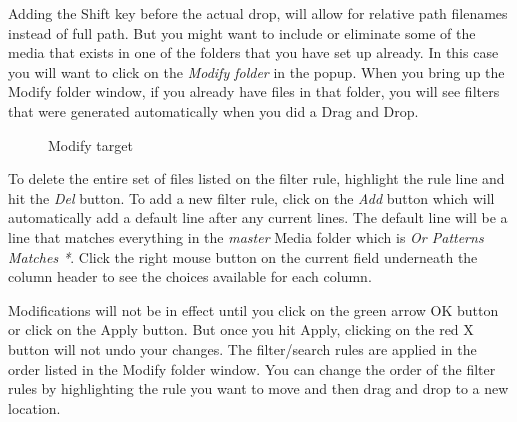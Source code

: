Adding the Shift key before the actual drop, will allow for relative path filenames instead of full path.
But you might want to include or eliminate some of the media that exists in one of the folders that you have set up already.  
In this case you will want to click on the \textit{Modify folder} in the popup.  
When you bring up the Modify folder window, if you already have files in that folder, you will see filters that were generated automatically when you did a Drag and Drop.


\begin{figure}[htpb]
    \centering
    
    \caption{Modify target}
    \label{fig:modify-target}
\end{figure}

To delete the entire set of files listed on the filter rule, highlight the rule line and hit the \textit{Del} button.  
To add a new filter rule, click on the \textit{Add} button which will automatically add a default line after any current lines.  
The default line will be a line that matches everything in the \textit{master} Media folder which is \textit{Or  Patterns  Matches   *}.  
Click the right mouse button on the current field underneath the column header to see the choices available for each column.  

Modifications will not be in effect until you click on the green arrow OK button or click on the Apply button.  
But once you hit Apply, clicking on the red X button will not undo your changes.  
The filter/search rules are applied in the order listed in the Modify folder window.  
You can change the order of the filter rules by highlighting the rule you want to move and then drag and drop to a new location.

